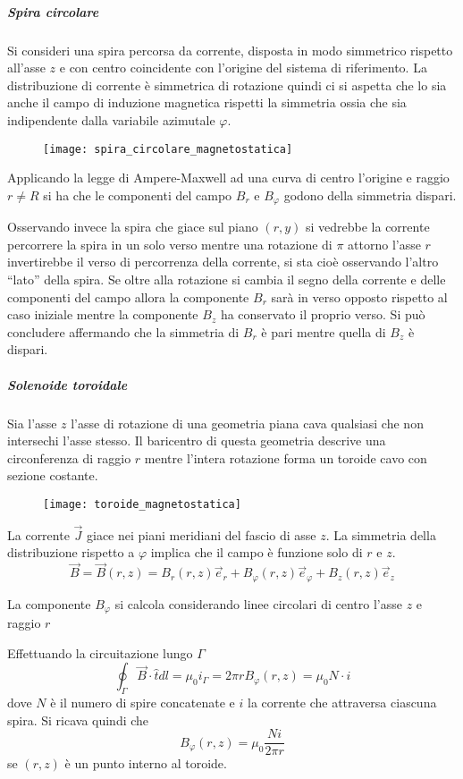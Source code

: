 
\subparagraph{Spira circolare}
Si consideri una spira percorsa da corrente, disposta in modo simmetrico
rispetto all'asse $z$ e con centro coincidente con l'origine del sistema 
di riferimento. La distribuzione di corrente è simmetrica di rotazione quindi ci si 
aspetta che lo sia anche il campo di induzione magnetica rispetti la simmetria ossia
che sia indipendente dalla variabile azimutale $\varphi$.
\begin{figure}[H]
\centering
\texttt{[image: spira\_circolare\_magnetostatica]}
\end{figure}
Applicando la legge di Ampere-Maxwell ad una curva di centro l'origine e raggio $r\neq R$
si ha che le componenti del campo $B_r$ e $B_\varphi$ godono della simmetria dispari.

Osservando invece la spira che giace sul piano $(r,y)$ si vedrebbe la corrente percorrere
la spira in un solo verso mentre una rotazione di $\pi$ attorno l'asse $r$ invertirebbe
il verso di percorrenza della corrente, si sta cioè osservando l'altro ``lato'' della spira.
Se oltre alla rotazione si cambia il segno della corrente e delle componenti del campo
allora la componente $B_r$ sarà in verso opposto rispetto al caso iniziale mentre
la componente $B_z$ ha conservato il proprio verso.
Si può concludere affermando che la simmetria di $B_r$ è pari mentre quella di $B_z$ è
dispari.

\subparagraph{Solenoide toroidale}
Sia l'asse $z$ l'asse di rotazione di una geometria piana cava qualsiasi che non intersechi
l'asse stesso. Il baricentro di questa geometria descrive una circonferenza di raggio $r$
mentre l'intera rotazione forma un toroide cavo con sezione costante.
\begin{figure}[H]
\centering
\texttt{[image: toroide\_magnetostatica]}
\end{figure}
La corrente $\vec{J}$ giace nei piani meridiani del fascio di asse $z$.
La simmetria della distribuzione rispetto a $\varphi$ implica che il campo è funzione solo
di $r$ e $z$.
$$
\vec{B} = \vec{B}(r,z) = B_r(r,z)\vec{e}_r + B_\varphi(r,z)\vec{e}_\varphi + B_z(r,z)\vec{e}_z 
$$

La componente $B_\varphi$ si calcola considerando linee circolari di centro l'asse $z$
e raggio $r$

Effettuando la circuitazione lungo $\Gamma$
$$
\oint_\Gamma \vec{B} \cdot \hat{t} dl = \mu_0 i_\Gamma = 2\pi r B_\varphi (r,z)  = \mu_0 N\cdot i
$$
dove $N$ è il numero di spire concatenate e $i$ la corrente che attraversa ciascuna spira.
Si ricava quindi che 
$$
B_\varphi (r,z) = \mu_0 \frac{Ni}{2\pi r}
$$
se $(r,z)$ è un punto interno al toroide.

